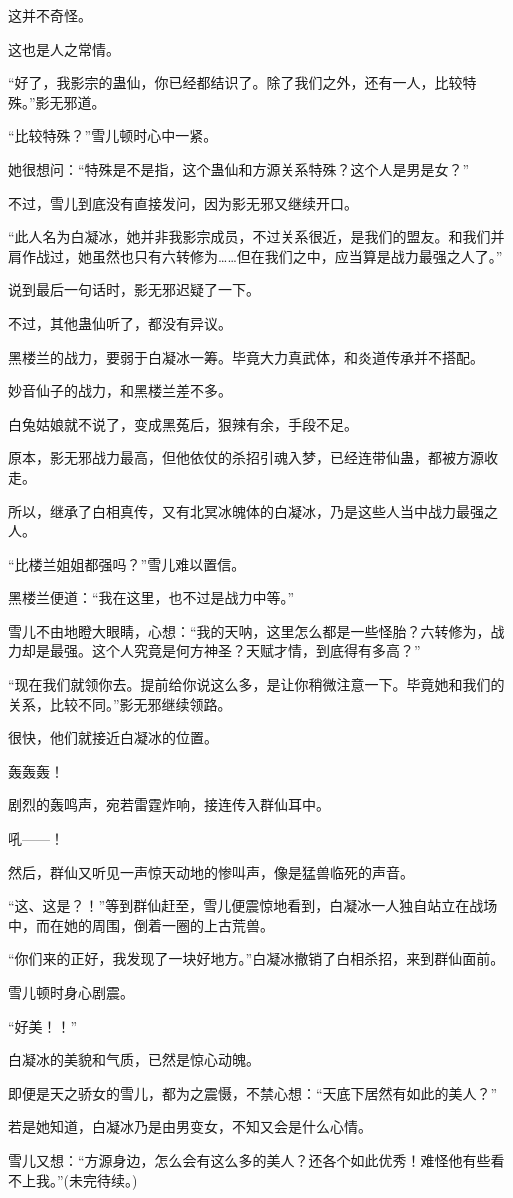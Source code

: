 \begin{this_body}
这并不奇怪。

这也是人之常情。

“好了，我影宗的蛊仙，你已经都结识了。除了我们之外，还有一人，比较特殊。”影无邪道。

“比较特殊？”雪儿顿时心中一紧。

她很想问：“特殊是不是指，这个蛊仙和方源关系特殊？这个人是男是女？”

不过，雪儿到底没有直接发问，因为影无邪又继续开口。

“此人名为白凝冰，她并非我影宗成员，不过关系很近，是我们的盟友。和我们并肩作战过，她虽然也只有六转修为……但在我们之中，应当算是战力最强之人了。”

说到最后一句话时，影无邪迟疑了一下。

不过，其他蛊仙听了，都没有异议。

黑楼兰的战力，要弱于白凝冰一筹。毕竟大力真武体，和炎道传承并不搭配。

妙音仙子的战力，和黑楼兰差不多。

白兔姑娘就不说了，变成黑菟后，狠辣有余，手段不足。

原本，影无邪战力最高，但他依仗的杀招引魂入梦，已经连带仙蛊，都被方源收走。

所以，继承了白相真传，又有北冥冰魄体的白凝冰，乃是这些人当中战力最强之人。

“比楼兰姐姐都强吗？”雪儿难以置信。

黑楼兰便道：“我在这里，也不过是战力中等。”

雪儿不由地瞪大眼睛，心想：“我的天呐，这里怎么都是一些怪胎？六转修为，战力却是最强。这个人究竟是何方神圣？天赋才情，到底得有多高？”

“现在我们就领你去。提前给你说这么多，是让你稍微注意一下。毕竟她和我们的关系，比较不同。”影无邪继续领路。

很快，他们就接近白凝冰的位置。

轰轰轰！

剧烈的轰鸣声，宛若雷霆炸响，接连传入群仙耳中。

吼——！

然后，群仙又听见一声惊天动地的惨叫声，像是猛兽临死的声音。

“这、这是？！”等到群仙赶至，雪儿便震惊地看到，白凝冰一人独自站立在战场中，而在她的周围，倒着一圈的上古荒兽。

“你们来的正好，我发现了一块好地方。”白凝冰撤销了白相杀招，来到群仙面前。

雪儿顿时身心剧震。

“好美！！”

白凝冰的美貌和气质，已然是惊心动魄。

即便是天之骄女的雪儿，都为之震慑，不禁心想：“天底下居然有如此的美人？”

若是她知道，白凝冰乃是由男变女，不知又会是什么心情。

雪儿又想：“方源身边，怎么会有这么多的美人？还各个如此优秀！难怪他有些看不上我。”(未完待续。)

\end{this_body}

